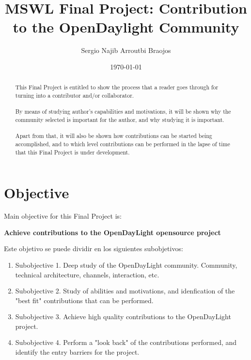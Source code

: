 \documentclass[10pt]{article}
\begin{document}
\title{MSWL Final Project: Contribution to the OpenDaylight Community}
\author{Sergio Najib Arroutbi Braojos}
\date{\today}


\maketitle

\begin{abstract}

This Final Project is entitled to show the process that a reader goes through for turning into a contributor and/or collaborator.\\
\\
By means of studying author's capabilities and motivations, it will be shown why the community selected is important for the author, and why studying it is important.\\
\\
Apart from that, it will also be shown how contributions can be started being accomplished, and to which level contributions can be performed in the lapse of time that this Final Project is under development.

\end{abstract}

\section{Objective}

Main objective for this Final Project is:

\begin{center}
\bf{Achieve contributions to the OpenDayLight opensource project}
\end{center}

Este objetivo se puede dividir en los siguientes subobjetivos:

\begin{enumerate}
  \item Subobjective 1. Deep study of the OpenDayLight community. Community, technical architecture, channels, interaction, etc.
  \item Subobjective 2. Study of abilities and motivations, and idenfication of the "best fit" contributions that can be performed.
  \item Subobjective 3. Achieve high quality contributions to the OpenDayLight project.
  \item Subobjective 4. Perform a "look back" of the contributions performed, and identify the entry barriers for the project.
\end{enumerate}
\end{document}
